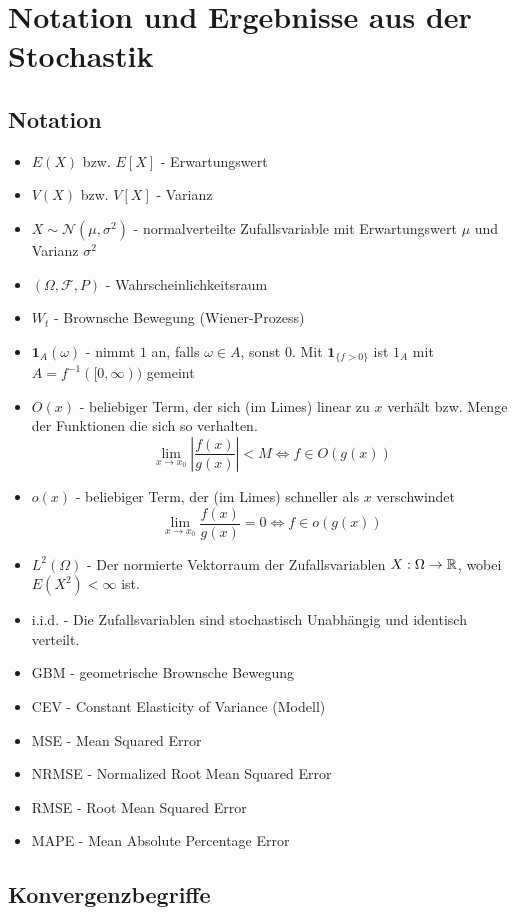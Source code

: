 \section{Notation und Ergebnisse aus der Stochastik}
\subsection{Notation}
\begin{itemize}
    \item $E(X)$ bzw. $E[X]$ - Erwartungswert
    \item $V(X)$ bzw. $V[X]$ - Varianz
    \item $X \sim \mathcal N(\mu, \sigma^2)$ - normalverteilte Zufallsvariable mit Erwartungswert $\mu$ und Varianz $\sigma^2$
    \item $(\Omega, \mathcal F, P)$ - Wahrscheinlichkeitsraum
    \item $W_t$ - Brownsche Bewegung (Wiener-Prozess)
    \item $\mathbf 1_A(\omega)$ - nimmt $1$ an, falls $\omega \in A$, sonst $0$. Mit $\mathbf 1_{\{f \gt 0\}}$ ist $1_A$ mit $A=f^{-1}([0, \infty))$ gemeint
    \item $O(x)$ - beliebiger Term, der sich (im Limes) linear zu $x$ verhält bzw. Menge der Funktionen die sich so verhalten.
$$\lim_{x \to x_0} \left \vert \frac{f(x)}{g(x)} \right \vert  \lt M \iff f \in O(g(x))$$    
    \item $o(x)$ - beliebiger Term, der (im Limes) schneller als $x$ verschwindet
$$\lim_{x \to x_0} \frac{f(x)}{g(x)} = 0 \iff f \in o(g(x))$$    
    \item $L^2(\Omega)$ - Der normierte Vektorraum der Zufallsvariablen $X : \Omega \to \Bbb R$, wobei $E(X^2) \lt \infty$ ist.
    \item i.i.d. - Die Zufallsvariablen sind stochastisch Unabhängig und identisch verteilt.
    \item GBM - geometrische Brownsche Bewegung
    \item CEV - Constant Elasticity of Variance (Modell)
    \item MSE - Mean Squared Error
    \item NRMSE - Normalized Root Mean Squared Error
    \item RMSE - Root Mean Squared Error
    \item MAPE - Mean Absolute Percentage Error
\end{itemize}

\subsection{Konvergenzbegriffe}

